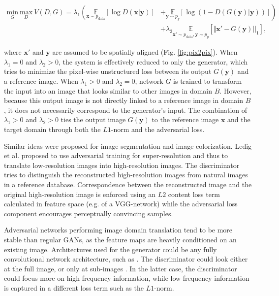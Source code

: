 \documentclass{article}
\begin{document}
\begin{equation}
\begin{split}
\underset{G}{\text{min}}~\underset{D}{\text{max}}~V(D,G)=\lambda_1 \left(\underset{\mathbf{x}\sim p_{\text{data}}}{\mathds{E}} [\log{D(\mathbf{x}|\mathbf{y})}]\right. & +\left.\underset{\mathbf{y}\sim p_y}{\mathds{E}} [\log{(1-D(G(\mathbf{y})|\mathbf{y}))}]\right) \\ &+\lambda_2 \underset{\mathbf{x'}\sim p_{\text{data}},\mathbf{y}\sim p_y}{\mathds{E}}[\Vert \mathbf{x'} - G(\mathbf{y})||_1],
\end{split}
\label{eq:pix2pix}
\end{equation}

where $\mathbf{x'}$ and $\mathbf{y}$ are assumed to be spatially aligned (Fig. \ref{fig:pix2pix}). When $\lambda_1=0$ and $\lambda_2>0$, the system is effectively reduced to only the generator, which tries to minimize the pixel-wise unstructured loss between its output $G(\mathbf{y})$ and a reference image. When $\lambda_1>0$ and $\lambda_2=0$, network $G$ is trained to transform the input into an image that looks similar to other images in domain $B$. However, because this output image is not directly linked to a reference image in domain $B$, it does not necessarily correspond to the generator's input. The combination of $\lambda_1>0$ and $\lambda_2>0$ ties the output image $G(\mathbf{y})$ to the reference image $\mathbf{x}$ and the target domain through both the $L1$-norm and the adversarial loss.

Similar ideas were proposed for image segmentation \cite{Luc16} and image colorization. Ledig et al. \cite{Ledi16} proposed to use adversarial training for super-resolution and thus to translate low-resolution images into high-resolution images. The discriminator tries to distinguish the reconstructed high-resolution images from natural images in a reference database. Correspondence between the reconstructed image and the original high-resolution image is enforced using an $L2$ content loss term calculated in feature space (e.g. of a VGG-network) while the adversarial loss component encourages perceptually convincing samples.

Adversarial networks performing image domain translation tend to be more stable than regular GANs, as the feature maps are heavily conditioned on an existing image. Architectures used for the generator could be any fully convolutional network architecture, such as \cite{Long15,Ronn15,Yu15}. The discriminator could look either at the full image, or only at sub-images \cite{Isol17,Zhu17}. In the latter case, the discriminator could focus more on high-frequency information, while low-frequency information is captured in a different loss term such as the $L1$-norm.
\end{document}
